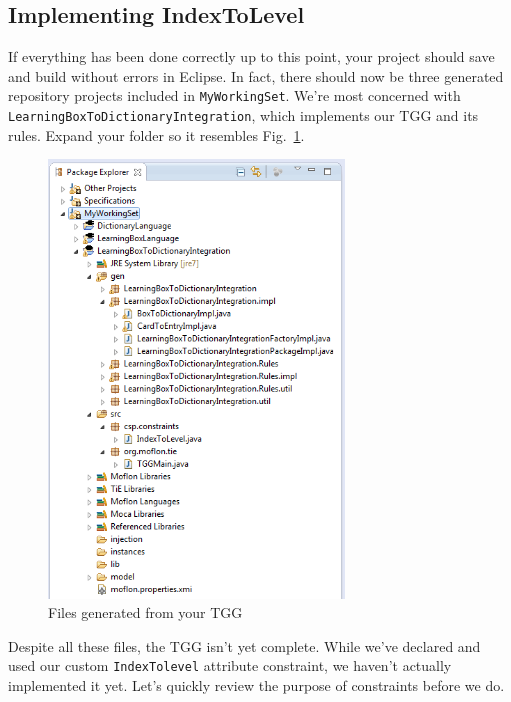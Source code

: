 \newpage
\hypertarget{subsec:IndexToLevel}{}
\subsection{Implementing IndexToLevel}
\genHeader

If everything has been done correctly up to this point, your project should save and build without errors in Eclipse. In fact, there should now be three
generated repository projects included in \texttt{MyWorkingSet}. We're most concerned with \texttt{LearningBox\-To\-Dictionary\-Integration}, which implements
our TGG and its rules. Expand your folder so it resembles Fig.~\ref{eclipse:tggGenerated}.

\begin{figure}[htbp]
\begin{center}
  \includegraphics[width=0.7\textwidth]{eclipse_generatedTGG}
  \caption{Files generated from your TGG}
  \label{eclipse:tggGenerated}
\end{center}
\end{figure}

Despite all these files, the TGG isn't yet complete. While we've declared and used our custom \texttt{IndexTolevel} attribute constraint, we haven't actually
implemented it yet. Let's quickly review the purpose of constraints before we do.


